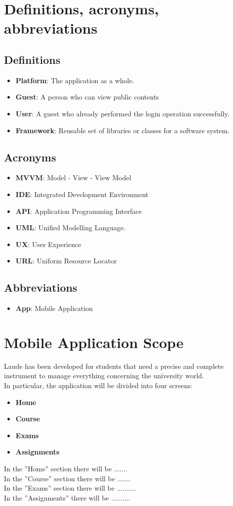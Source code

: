 \documentclass[numbers=noenddot, 12pt, a4paper, oneside]{scrbook}
\begin{document}
\section{Definitions, acronyms, abbreviations}
\subsection*{Definitions}
\begin{itemize}
	\item \textbf{Platform}: The application as a whole.
	\item \textbf{Guest}: A person who can view public contents
	\item \textbf{User}: A guest who already performed the login operation successfully.
	\item \textbf{Framework}: Reusable set of libraries or classes for a software system.
\end{itemize}
\subsection*{Acronyms}
\begin{itemize}
	\item \textbf{MVVM}: Model - View - View Model
	\item \textbf{IDE}: Integrated Development Environment
	\item \textbf{API}: Application Programming Interface
	\item \textbf{UML}: Unified Modelling Language.
	\item \textbf{UX}: User Experience
	\item \textbf{URL}: Uniform Resource Locator
\end{itemize}
\subsection*{Abbreviations}
\begin{itemize}
	\item \textbf{App}: Mobile Application 
\end{itemize}

\section{Mobile Application Scope}
Laude has been developed for students that need a precise and complete instrument to manage everything concerning the university world.\\
In particular, the application will be divided into four screens:
\begin{itemize}
	\item \textbf{Home}
	\item \textbf{Course}
	\item \textbf{Exams}
	\item \textbf{Assignments}
\end{itemize}
In the ”Home” section there will be .......\\
In the ”Course” section there will be .......\\
In the ”Exams” section there will be ..........\\
In the ”Assignments”  there will be ..........
\end{document}
